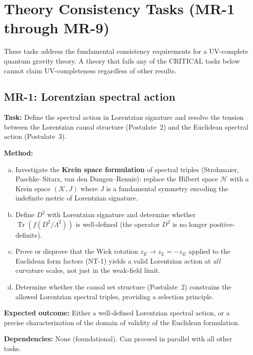 \documentclass[12pt,a4paper]{article}
\newcommand{\Tr}{\operatorname{Tr}}
\newcommand{\task}[1]{\noindent\textbf{Task:} #1\par}
\newcommand{\method}[1]{\noindent\textbf{Method:} #1\par}
\newcommand{\outcome}[1]{\noindent\textbf{Expected outcome:} #1\par}
\newcommand{\deps}[1]{\noindent\textbf{Dependencies:} #1\par}
\begin{document}
\section{\textcolor{mid}{Theory Consistency Tasks (MR-1 through MR-9)}}
\label{sec:consistency}

These tasks address the fundamental consistency requirements for a UV-complete
quantum gravity theory. A theory that fails any of the CRITICAL tasks below
cannot claim UV-completeness regardless of other results.

\subsection{MR-1: Lorentzian spectral action}
\label{task:MR1}

\task{Define the spectral action in Lorentzian signature and resolve the
tension between the Lorentzian causal structure (Postulate~2) and the
Euclidean spectral action (Postulate~3).}

\method{
\begin{enumerate}[(a)]
  \item Investigate the \textbf{Krein space formulation} of spectral triples
    (Strohmaier, Paschke--Sitarz, van den Dungen--Rennie): replace the
    Hilbert space $\mathcal{H}$ with a Krein space $(\mathcal{K}, J)$ where
    $J$ is a fundamental symmetry encoding the indefinite metric of
    Lorentzian signature.
  \item Define $D^2$ with Lorentzian signature and determine whether
    $\Tr(f(D^2/\Lambda^2))$ is well-defined (the operator $D^2$ is no
    longer positive-definite).
  \item Prove or disprove that the Wick rotation $z_E \to z_L = -z_E$
    applied to the Euclidean form factors (NT-1) yields a valid Lorentzian
    action at \emph{all} curvature scales, not just in the weak-field limit.
  \item Determine whether the causal set structure (Postulate~2) constrains
    the allowed Lorentzian spectral triples, providing a selection principle.
\end{enumerate}
}

\outcome{Either a well-defined Lorentzian spectral action, or a precise
characterization of the domain of validity of the Euclidean formulation.}

\deps{None (foundational). Can proceed in parallel with all other tasks.}
\end{document}

